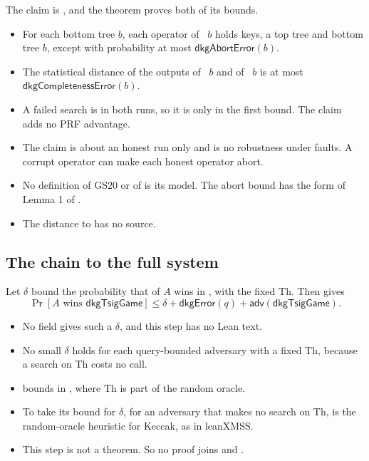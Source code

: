 \documentclass[11pt]{article}
\makeatletter
\newcommand{\Th}{\mathrm{Th}}
\renewcommand\paragraph{\@startsection{paragraph}{4}{\z@}{-2.25ex \@plus -.8ex \@minus -.2ex}{0.4ex}{\normalfont\normalsize\bfseries}}
\makeatother
\begin{document}
\paragraph{Completeness}
The claim is , and the theorem  proves both of its
bounds.
\begin{itemize}
\item For each bottom tree $b$, each operator of ~$b$ holds keys, a top tree and
bottom tree $b$, except with probability at most $\mathsf{dkgAbortError}(b)$.
\item The statistical distance of the outputs of ~$b$ and of ~$b$
is at most $\mathsf{dkgCompletenessError}(b)$.
\item A failed search is in both runs, so it is only in the first bound. The claim adds no PRF
advantage.
\item The claim is about an honest run only and is no robustness under faults. A corrupt operator
can make each honest operator abort.
\item No definition of GS20 or of \cite{GJM+21} is its model. The abort bound has the form of
Lemma 1 of \cite{GJM+21}.
\item The distance to  has no source.
\end{itemize}

\subsection{The chain to the full system}\label{sec:chain}
Let $\delta$ bound the probability that  of $A$ wins  in
, with the fixed $\Th$. Then  gives
\[
 \Pr[A\text{ wins }\mathsf{dkgTsigGame}]\le\delta+\mathsf{dkgError}(q)+\mathsf{adv}(\mathsf{dkgTsigGame}).
\]
\begin{itemize}
\item No field gives such a $\delta$, and this step has no Lean text.
\item No small $\delta$ holds for each query-bounded adversary with a fixed $\Th$, because a search
on $\Th$ costs no call.
\item {} bounds  in , where $\Th$ is part
of the random oracle.
\item To take its bound for $\delta$, for an adversary that makes no search on $\Th$, is the
random-oracle heuristic for Keccak, as in leanXMSS.
\item This step is not a theorem. So no proof joins  and
.
\end{itemize}
\end{document}
